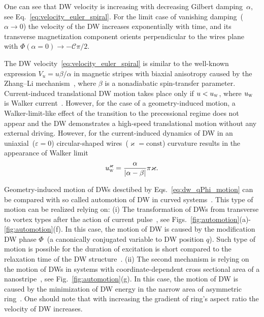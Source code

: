 \documentclass[runningheads]{llncs}
\begin{document}
One can see that DW velocity is increasing with decreasing Gilbert damping~$\alpha$, see Eq.~\eqref{eq:velocity_euler_spiral}. For the limit case of vanishing damping~($\alpha\to0$) the velocity of the DW increases exponentially with time, and its transverse magnetization component orients perpendicular to the wires plane with $\Phi(\alpha=0)\to-\mathcal{C}\pi/2$. 

The DW velocity~\eqref{eq:velocity_euler_spiral} is similar to the well-known expression $V_u = u \beta/\alpha$ in magnetic stripes with biaxial anisotropy caused by the Zhang--Li mechanism~\cite{Bazaliy98,Zhang04}, where $\beta$ is a nonadiabatic spin-transfer parameter. Current-induced translational DW motion takes place only if $u<u_\textsc{w}$, where $u_\textsc{w}$ is Walker current~\cite{Thiaville05}. However, for the case of a geometry-induced motion, a Walker-limit-like effect of the transition to the precessional regime does not appear and the DW demonstrates a high-speed translational motion without any external driving. However, for the current-induced dynamics of DW in an uniaxial~($\varepsilon=0$) circular-shaped wires~($\varkappa=\text{const}$) curvature results in the appearance of Walker limit~\cite{Yershov16}
\begin{equation}
u_\textsc{w}^\varkappa=\frac{\alpha}{|\alpha-\beta|}\pi\varkappa.
\end{equation}

Geometry-induced motion of DWs desctibed by Eqs.~\eqref{eq:dw_qPhi_motion} can be compared with so called automotion of DW in curved systems~\cite{Chauleau10,Richter16,Mawass17}. This type of motion can be realized relying on: (i) The transformation of DWs from transverse to vortex types after the action of current pulse~\cite{Chauleau10}, see Figs.~\ref{fig:automotion}(a)-\ref{fig:automotion}(f). In this case, the motion of DW is caused by the modification DW phase $\Phi$~(a canonically conjugated variable to DW position $q$). Such type of motion is possible for the duration of excitation is short compared to the relaxation time of the DW structure~\cite{Chauleau10}. (ii) The second mechanism is relying on the motion of DWs in systems with coordinate-dependent cross sectional area of a nanostripe~\cite{Richter16,Mawass17}, see Fig.~\ref{fig:automotion}(g). In this case, the motion of DW is caused by the minimization of DW energy in the narrow area of asymmetric ring~\cite{Mawass17}. One should note that with increasing the gradient of ring's aspect ratio the velocity of DW increases.
\end{document}
